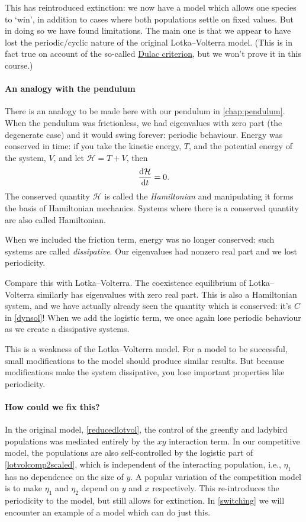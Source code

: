 \documentclass[main.tex]{subfiles}
\begin{document}
This has reintroduced extinction: we now have a model which allows one species to `win', in addition to cases where both populations settle on fixed values.  But in doing so we have found limitations. The main one is that we appear to have lost the periodic/cyclic nature of the original Lotka--Volterra model. (This is in fact true on account of the so-called \href{https://en.wikipedia.org/wiki/Bendixson\%E2\%80\%93Dulac_theorem}{Dulac criterion}, but we won't prove it in this course.)

\paragraph{An analogy with the pendulum}
There is an analogy to be made here with our pendulum in \cref{chap:pendulum}. When the pendulum was frictionless, we had eigenvalues with zero part (the degenerate case) and it would swing forever: periodic behaviour. Energy was conserved in time: if you take the kinetic energy, $T$, and the potential energy of the system, $V$, and let $\mathcal{H} = T+V$, then
\begin{equation}
	\fd{\mathcal{H}}{t} = 0.
\end{equation} 
The conserved quantity $\mathcal{H}$ is called the \emph{Hamiltonian} and manipulating it forms the basis of Hamiltonian mechanics. Systems where there is a conserved quantity are also called Hamiltonian. 

When we included the friction term, energy was no longer conserved: such systems are called \emph{dissipative}. Our eigenvalues had nonzero real part and we lost periodicity. 

Compare this with Lotka--Volterra. The coexistence equilibrium of Lotka--Volterra similarly has eigenvalues with zero real part. This is also a Hamiltonian system, and we have actually already seen the quantity which is conserved: it's $C$ in \cref{dynsol}! When we add the logistic term, we once again lose periodic behaviour as we create a dissipative systems. 

This is a weakness of the Lotka--Volterra model. For a model to be successful, small modifications to the model should produce similar results. But because modifications make the system dissipative, you lose important properties like periodicity.

\paragraph{How could we fix this?}
In the original model, \cref{reducedlotvol}, the control of the greenfly and ladybird populations was mediated entirely by the $xy$ interaction term. In our competitive model, the populations are also self-controlled by the logistic part of \cref{lotvolcomp2scaled}, which is independent of the interacting population, i.e., $\eta_1$ has no dependence on the size of $y$. A popular variation of the competition model is to make $\eta_1$ and $\eta_2$ depend on $y$ and $x$ respectively. This re-introduces the periodicity to the model, but still allows for extinction. In \cref{switching} we will encounter an example of a model which can do just this. 
\end{document}
